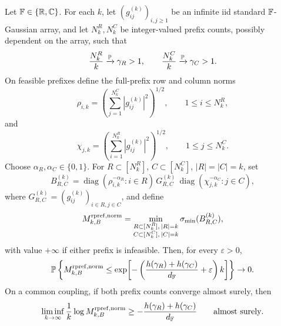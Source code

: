 \begin{corollary}\label{two:random-prefix-gaussian-full-prefix-normalization}
Let \(\mathbb{F}\in\{\mathbb{R},\mathbb{C}\}\).  For each \(k\), let
\((g_{ij}^{(k)})_{i,j\ge1}\) be an infinite iid standard \(\mathbb{F}\)-Gaussian array,
and let \(N_k^R,N_k^C\) be integer-valued prefix counts, possibly dependent on
the array, such that
\[
  \frac{N_k^R}{k}\xrightarrow{\mathbb{P}}\gamma_R>1,\qquad
  \frac{N_k^C}{k}\xrightarrow{\mathbb{P}}\gamma_C>1.
\]
On feasible prefixes define the full-prefix row and column norms
\[
  \rho_{i,k}
  =
  \left(\sum_{j=1}^{N_k^C}|g_{ij}^{(k)}|^2\right)^{1/2},
  \qquad 1\le i\le N_k^R,
\]
and
\[
  \chi_{j,k}
  =
  \left(\sum_{i=1}^{N_k^R}|g_{ij}^{(k)}|^2\right)^{1/2},
  \qquad 1\le j\le N_k^C.
\]
Choose \(\alpha_R,\alpha_C\in\{0,1\}\).  For
\(R\subset[N_k^R]\), \(C\subset[N_k^C]\), \(|R|=|C|=k\), set
\[
  B_{R,C}^{(k)}
  =
  \operatorname{diag}(\rho_{i,k}^{-\alpha_R}:i\in R)\,
  G_{R,C}^{(k)}\,
  \operatorname{diag}(\chi_{j,k}^{-\alpha_C}:j\in C),
\]
where \(G_{R,C}^{(k)}=(g_{ij}^{(k)})_{i\in R,j\in C}\), and define
\[
  M_{k,B}^{\rm rpref,norm}
  =
  \min_{\substack{R\subset[N_k^R],\, |R|=k\\
                  C\subset[N_k^C],\, |C|=k}}
  \sigma_{\min}(B_{R,C}^{(k)}),
\]
with value \(+\infty\) if either prefix is infeasible.  Then, for every
\(\varepsilon>0\),
\[
  \mathbb{P}\left\{
  M_{k,B}^{\rm rpref,norm}\le
  \exp\!\left[-\left(
  \frac{h(\gamma_R)+h(\gamma_C)}{d_{\mathbb{F}}}+\varepsilon
  \right)k\right]\right\}\to0.
\]
On a common coupling, if both prefix counts converge almost surely, then
\[
  \liminf_{k\to\infty}\frac1k\log M_{k,B}^{\rm rpref,norm}
  \ge
  -\frac{h(\gamma_R)+h(\gamma_C)}{d_{\mathbb{F}}}
  \qquad\hbox{almost surely}.
\]
\end{corollary}

